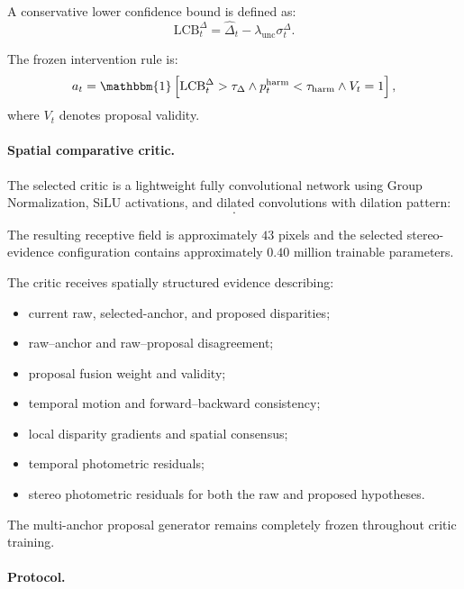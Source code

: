 \documentclass[11pt,a4paper]{article}
\begin{document}
A conservative lower confidence bound is defined as:
\begin{equation}
    \mathrm{LCB}_{t}^{\Delta}
    =
    \widehat{\Delta}_t
    -
    \lambda_{\mathrm{unc}}
    \sigma_t^{\Delta}.
\end{equation}

The frozen intervention rule is:
\begin{equation}
    a_t
    =
    \mathbbm{1}
    \left[
        \mathrm{LCB}_{t}^{\Delta}>\tau_{\Delta}
        \land
        p_t^{\mathrm{harm}}<\tau_{\mathrm{harm}}
        \land
        V_t=1
    \right],
\end{equation}
where \(V_t\) denotes proposal validity.

\paragraph{Spatial comparative critic.}

The selected critic is a lightweight fully convolutional network using
Group Normalization, SiLU activations, and dilated convolutions with dilation
pattern:
\begin{equation}
    [1,2,4,2,1].
\end{equation}

The resulting receptive field is approximately \(43\) pixels and the selected
stereo-evidence configuration contains approximately \(0.40\) million trainable
parameters.

The critic receives spatially structured evidence describing:

\begin{itemize}
    \item current raw, selected-anchor, and proposed disparities;
    \item raw--anchor and raw--proposal disagreement;
    \item proposal fusion weight and validity;
    \item temporal motion and forward--backward consistency;
    \item local disparity gradients and spatial consensus;
    \item temporal photometric residuals;
    \item stereo photometric residuals for both the raw and proposed hypotheses.
\end{itemize}

The multi-anchor proposal generator remains completely frozen throughout critic
training.

\paragraph{Protocol.}
\end{document}
